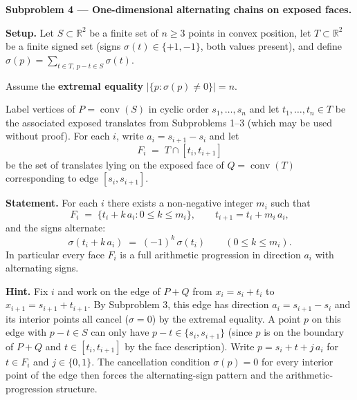 \documentclass{article}
\begin{document}
\textbf{Subproblem 4 --- One-dimensional alternating chains on exposed faces.}

\medskip
\textbf{Setup.}
Let $S\subset\mathbb{R}^2$ be a finite set of $n\ge 3$ points in convex position,
let $T\subset\mathbb{R}^2$ be a finite signed set (signs $\sigma(t)\in\{+1,-1\}$,
both values present), and define $\sigma(p)=\sum_{t\in T,\,p-t\in S}\sigma(t)$.

Assume the \textbf{extremal equality} $|\{p:\sigma(p)\neq 0\}|=n$.

Label vertices of $P=\operatorname{conv}(S)$ in cyclic order $s_1,\dots,s_n$ and let
$t_1,\dots,t_n\in T$ be the associated exposed translates from Subproblems 1--3
(which may be used without proof).
For each $i$, write $a_i=s_{i+1}-s_i$ and let
\[
  F_i \;=\; T\cap [t_i,t_{i+1}]
\]
be the set of translates lying on the exposed face of $Q=\operatorname{conv}(T)$
corresponding to edge $[s_i,s_{i+1}]$.

\medskip
\textbf{Statement.}
For each $i$ there exists a non-negative integer $m_i$ such that
\[
  F_i \;=\; \bigl\{t_i + k\,a_i : 0\le k\le m_i\bigr\},
  \qquad
  t_{i+1} = t_i + m_i\,a_i,
\]
and the signs alternate:
\[
  \sigma(t_i + k\,a_i) \;=\; (-1)^k\,\sigma(t_i)
  \qquad (0\le k\le m_i).
\]
In particular every face $F_i$ is a full arithmetic progression in direction $a_i$
with alternating signs.

\medskip
\textbf{Hint.}
Fix $i$ and work on the edge of $P+Q$ from $x_i=s_i+t_i$ to $x_{i+1}=s_{i+1}+t_{i+1}$.
By Subproblem 3, this edge has direction $a_i=s_{i+1}-s_i$ and its interior points
all cancel ($\sigma=0$) by the extremal equality.
A point $p$ on this edge with $p-t\in S$ can only have $p-t\in\{s_i,s_{i+1}\}$ (since $p$
is on the boundary of $P+Q$ and $t\in[t_i,t_{i+1}]$ by the face description).
Write $p=s_i+t+j\,a_i$ for $t\in F_i$ and $j\in\{0,1\}$.
The cancellation condition $\sigma(p)=0$ for every interior point of the edge then
forces the alternating-sign pattern and the arithmetic-progression structure.
\end{document}
